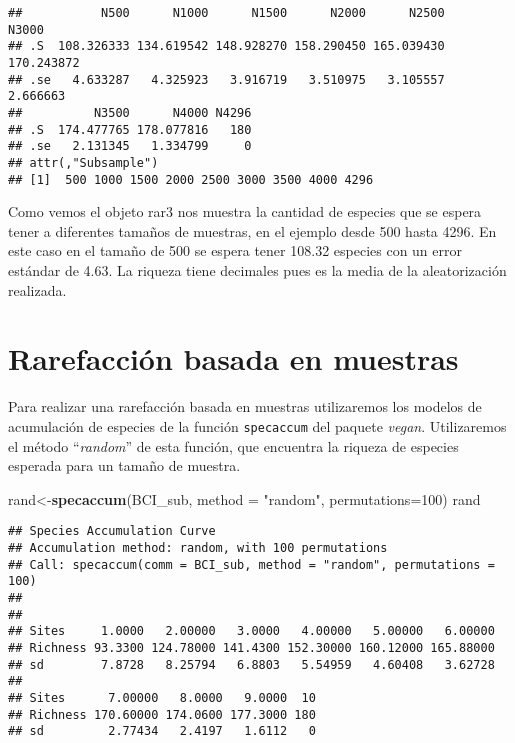 \documentclass[]{book}
\newenvironment{Shaded}{\begin{snugshade}}{\end{snugshade}}
\newcommand{\KeywordTok}[1]{\textcolor[rgb]{0.13,0.29,0.53}{\textbf{{#1}}}}
\newcommand{\DataTypeTok}[1]{\textcolor[rgb]{0.13,0.29,0.53}{{#1}}}
\newcommand{\DecValTok}[1]{\textcolor[rgb]{0.00,0.00,0.81}{{#1}}}
\newcommand{\StringTok}[1]{\textcolor[rgb]{0.31,0.60,0.02}{{#1}}}
\newcommand{\NormalTok}[1]{{#1}}
\begin{document}
\begin{verbatim}
##           N500      N1000      N1500      N2000      N2500      N3000
## .S  108.326333 134.619542 148.928270 158.290450 165.039430 170.243872
## .se   4.633287   4.325923   3.916719   3.510975   3.105557   2.666663
##          N3500      N4000 N4296
## .S  174.477765 178.077816   180
## .se   2.131345   1.334799     0
## attr(,"Subsample")
## [1]  500 1000 1500 2000 2500 3000 3500 4000 4296
\end{verbatim}

Como vemos el objeto rar3 nos muestra la cantidad de especies que se
espera tener a diferentes tamaños de muestras, en el ejemplo desde 500
hasta 4296. En este caso en el tamaño de 500 se espera tener 108.32
especies con un error estándar de 4.63. La riqueza tiene decimales pues
es la media de la aleatorización realizada.

\section{Rarefacción basada en
muestras}\label{rarefaccion-basada-en-muestras}

Para realizar una rarefacción basada en muestras utilizaremos los
modelos de acumulación de especies de la función \texttt{specaccum} del
paquete \emph{vegan}. Utilizaremos el método ``\emph{random}'' de esta
función, que encuentra la riqueza de especies esperada para un tamaño de
muestra.

\begin{Shaded}
\begin{Highlighting}[]
\NormalTok{rand<-}\KeywordTok{specaccum}\NormalTok{(BCI_sub, }\DataTypeTok{method =} \StringTok{"random"}\NormalTok{, }\DataTypeTok{permutations=}\DecValTok{100}\NormalTok{)}
\NormalTok{rand}
\end{Highlighting}
\end{Shaded}

\begin{verbatim}
## Species Accumulation Curve
## Accumulation method: random, with 100 permutations
## Call: specaccum(comm = BCI_sub, method = "random", permutations = 100) 
## 
##                                                                  
## Sites     1.0000   2.00000   3.0000   4.00000   5.00000   6.00000
## Richness 93.3300 124.78000 141.4300 152.30000 160.12000 165.88000
## sd        7.8728   8.25794   6.8803   5.54959   4.60408   3.62728
##                                         
## Sites      7.00000   8.0000   9.0000  10
## Richness 170.60000 174.0600 177.3000 180
## sd         2.77434   2.4197   1.6112   0
\end{verbatim}
\end{document}
